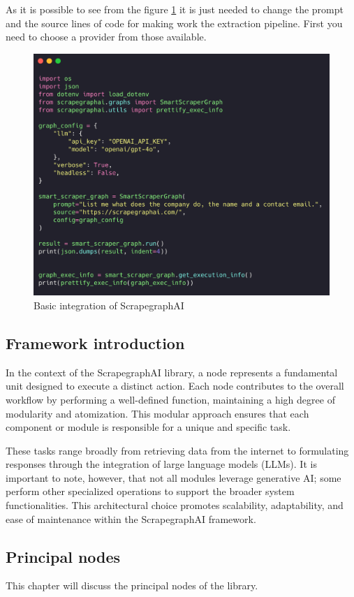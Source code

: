 As it is possible to see from the figure \ref{fig:scrapegraph-script} it is just needed to change the prompt and the source lines of code for making work the extraction pipeline. First you need to choose a provider from those available.

\begin{figure}[h!]
    \centering
    \includegraphics[width=0.75\linewidth]{Assets/scrapegraph_integration.png}
    \caption{Basic integration of ScrapegraphAI }
    \label{fig:scrapegraph-script}
\end{figure}

\subsection{Framework introduction}

In the context of the ScrapegraphAI  library, a node represents a fundamental unit designed to execute a distinct action. Each node contributes to the overall workflow by performing a well-defined function, maintaining a high degree of modularity and atomization. This modular approach ensures that each component or module is responsible for a unique and specific task.

These tasks range broadly from retrieving data from the internet to formulating responses through the integration of large language models (LLMs). It is important to note, however, that not all modules leverage generative AI; some perform other specialized operations to support the broader system functionalities. This architectural choice promotes scalability, adaptability, and ease of maintenance within the ScrapegraphAI  framework.
\subsection{Principal nodes}
This chapter will discuss the principal nodes of the library. 
